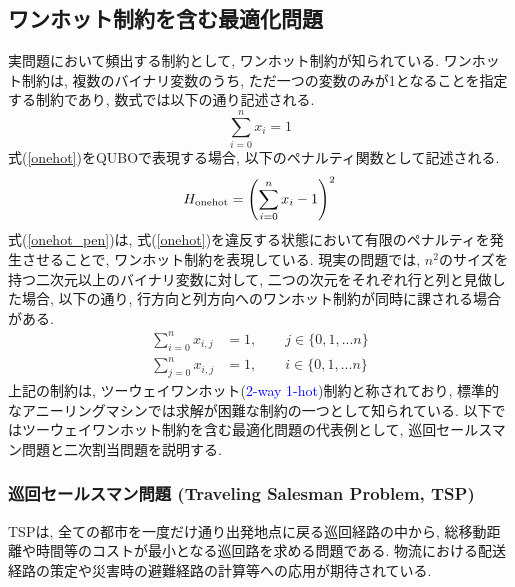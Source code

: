 \documentclass[submit,techrep,noauthor]{ipsj}
\begin{document}
\subsection{ワンホット制約を含む最適化問題}
実問題において頻出する制約として, ワンホット制約が知られている. ワンホット制約は, 複数のバイナリ変数のうち, ただ一つの変数のみが1となることを指定する制約であり, 数式では以下の通り記述される.
\begin{equation}
\sum_{i=0}^{n}x_{i} = 1 \label{onehot}
\end{equation}
式(\ref{onehot})をQUBOで表現する場合, 以下のペナルティ関数として記述される.
\begin{equation}
H_{{\rm onehot}}=\left(\sum_{i=0}^{n}x_{i} - 1\right)^{2} \label{onehot_pen}
\end{equation}
式(\ref{onehot_pen})は, 式(\ref{onehot})を違反する状態において有限のペナルティを発生させることで, ワンホット制約を表現している. 現実の問題では, $n^{2}$のサイズを持つ二次元以上のバイナリ変数に対して, 二つの次元をそれぞれ行と列と見做した場合, 以下の通り, 行方向と列方向へのワンホット制約が同時に課される場合がある.
\begin{align}
\sum_{i=0}^{n}x_{i, j} &= 1,\hspace{2em}j\in\{0,1,...n\}\\
\sum_{j=0}^{n}x_{i, j} &= 1,\hspace{2em}i\in\{0,1,...n\}
\end{align}
上記の制約は, ツーウェイワンホット(\textcolor{blue}{2-way 1-hot})制約と称されており\cite{yatabe}, 標準的なアニーリングマシンでは求解が困難な制約の一つとして知られている\cite{da3}. 以下ではツーウェイワンホット制約を含む最適化問題の代表例として, 巡回セールスマン問題と二次割当問題を説明する.

\subsubsection{巡回セールスマン問題 (Traveling Salesman Problem, TSP)}
TSPは, 全ての都市を一度だけ通り出発地点に戻る巡回経路の中から, 総移動距離や時間等のコストが最小となる巡回路を求める問題である. 物流における配送経路の策定や災害時の避難経路の計算等への応用\textcolor{blue}{\cite{tsunami}}が期待されている. 
\end{document}
